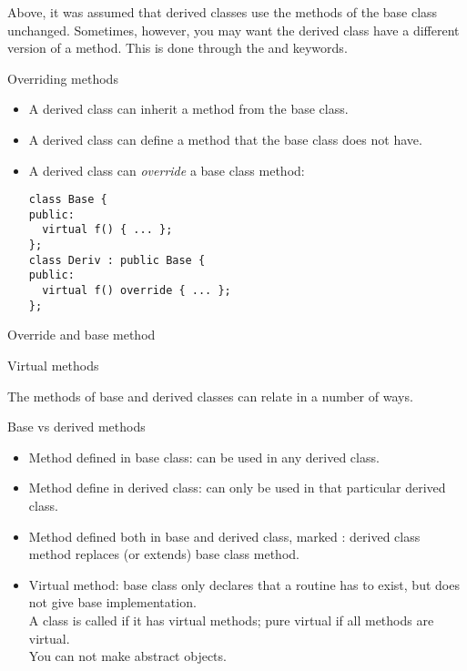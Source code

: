 Above, it was assumed that derived classes use the methods
of the base class unchanged.
Sometimes, however, you may want the derived class have a different version
of a method.
This is done through the  and  keywords.

\begin{block}{Overriding methods}
  \label{sl:obj-method-override}
  \begin{itemize}
  \item A derived class can inherit a method from the base class.
  \item A derived class can define a method that the base class does
    not have.
  \item A derived class can \emph{override} a
    base class method:
  \lstset{style=snippetcode}
\begin{lstlisting}
class Base {
public:
  virtual f() { ... };
};
class Deriv : public Base {
public:
  virtual f() override { ... };
};
\end{lstlisting}
  \end{itemize}
\end{block}

\begin{block}{Override and base method}
  \label{sl:virtualoverride}
\end{block}

 {Virtual methods}

The methods of base and derived classes can relate in a number of ways.

\begin{block}{Base vs derived methods}
  \begin{itemize}
  \item Method defined in base class: can be used in any derived class.
  \item Method define in derived class: can only be used in that
    particular derived class.
  \item Method defined both in base and derived class, marked
    : derived class method replaces (or extends)
    base class method.
  \item Virtual method: base class only declares that a routine has to
    exist, but does not give base implementation.\\ A class is called
     if it has virtual methods; pure
    virtual if all methods are virtual.\\ You can not make abstract objects.
  \end{itemize}  
\end{block}

